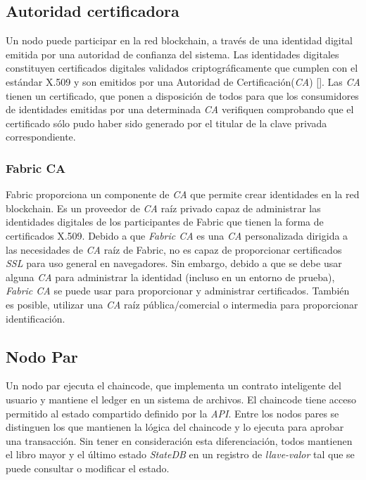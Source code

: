 \subsection{Autoridad certificadora}
Un nodo puede participar en la red blockchain, a trav\'es de una identidad digital emitida por una autoridad de confianza del sistema. Las identidades digitales constituyen certificados digitales validados criptogr\'aficamente que cumplen con el est\'andar X.509 y son emitidos por una Autoridad de Certificaci\'on(\emph{CA}) [\cite{CA}]. Las \emph{CA} tienen un certificado, que ponen a disposici\'on de todos para que los consumidores de identidades emitidas por una determinada \emph{CA} verifiquen comprobando que el certificado s\'olo pudo haber sido generado por el titular de la clave privada correspondiente.

\subsubsection{Fabric CA}
Fabric proporciona un componente de \emph{CA} que permite crear identidades en la red blockchain. Es un proveedor de \emph{CA} ra\'iz privado capaz de administrar las identidades digitales de los participantes de Fabric que tienen la forma de certificados X.509. Debido a que \emph{Fabric CA} es una \emph{CA} personalizada dirigida a las necesidades de \emph{CA} ra\'iz de Fabric, no es capaz de proporcionar certificados \emph{SSL} para uso general en navegadores. Sin embargo, debido a que se debe usar alguna \emph{CA} para administrar la identidad (incluso en un entorno de prueba), \emph{Fabric CA} se puede usar para proporcionar y administrar certificados. Tambi\'en es posible, utilizar una \emph{CA} ra\'iz p\'ublica/comercial o intermedia para proporcionar identificaci\'on.

\subsection{Nodo Par}
Un nodo par ejecuta el chaincode, que implementa un contrato inteligente del usuario y mantiene el ledger en un sistema de archivos. El chaincode tiene acceso permitido al estado compartido definido por la \emph{API}. Entre los nodos pares se distinguen los que mantienen la l\'ogica del chaincode y lo ejecuta para aprobar una transacci\'on. Sin tener en consideraci\'on esta diferenciaci\'on, todos mantienen el libro mayor y el \'ultimo estado \emph{StateDB} en un registro de \emph{llave-valor} tal que se puede consultar o modificar el estado.

